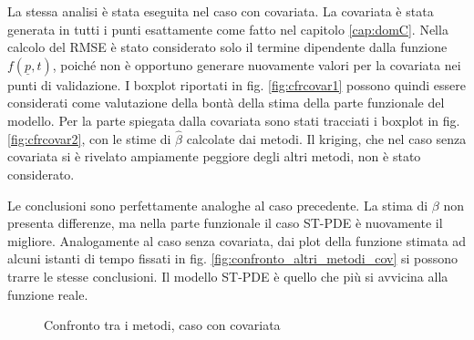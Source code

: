 \documentclass[a4paper,11pt,twoside,openright]{book}							%
\begin{document}
La stessa analisi è stata eseguita nel caso con covariata. La covariata è stata generata in tutti i punti esattamente come fatto nel capitolo \ref{cap:domC}. Nella calcolo del RMSE è stato considerato solo il termine dipendente dalla funzione $f(\underline p,t)$, poiché non è opportuno generare nuovamente valori per la covariata nei punti di validazione. I boxplot riportati in fig. \ref{fig:cfrcovar1} possono quindi essere considerati come valutazione della bontà della stima della parte funzionale del modello. Per la parte spiegata dalla covariata sono stati tracciati i boxplot in fig. \ref{fig:cfrcovar2}, con le stime di $\hat{\beta}$ calcolate dai metodi. Il kriging, che nel caso senza covariata si è rivelato ampiamente peggiore degli altri metodi, non è stato considerato.

Le conclusioni sono perfettamente analoghe al caso precedente. La stima di $\beta$ non presenta differenze, ma nella parte funzionale il caso ST-PDE è nuovamente il migliore. Analogamente al caso senza covariata, dai plot della funzione stimata ad alcuni istanti di tempo fissati in fig. \ref{fig:confronto_altri_metodi_cov} si possono trarre le stesse conclusioni. Il modello ST-PDE è quello che più si avvicina alla funzione reale.

\begin{figure}[t]
	\centering
	\caption{Confronto tra i metodi, caso con covariata}
	\label{fig:cfrcovar}
\end{figure}
\end{document}
